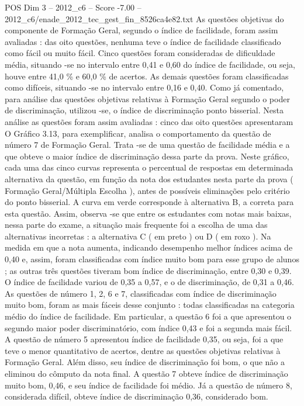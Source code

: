 \begin{textsample}{POS Dim 3 – 2012\_c6 – Score -7.00 – 2012\_c6/enade\_2012\_tec\_gest\_fin\_8526ca4e82.txt}
As questões objetivas do componente de Formação Geral, segundo o índice de facilidade, foram assim avaliadas : das oito questões, nenhuma teve o índice de facilidade classificado como fácil ou muito fácil.
Cinco questões foram consideradas de dificuldade média, situando -se no intervalo entre 0,41 e 0,60 do índice de facilidade, ou seja, houve entre 41,0 \% e 60,0 \% de acertos.
As demais questões foram classificadas como difíceis, situando -se no intervalo entre 0,16 e 0,40.
Como já comentado, para análise das questões objetivas relativas à Formação Geral segundo o poder de discriminação, utilizou -se, o índice de discriminação ponto bisserial.
Nesta análise as questões foram assim avaliadas : cinco das oito questões apresentaram O Gráfico 3.13, para exemplificar, analisa o comportamento da questão de número 7 de Formação Geral.
Trata -se de uma questão de facilidade média e a que obteve o maior índice de discriminação dessa parte da prova.
Neste gráfico, cada uma das cinco curvas representa o percentual de respostas em determinada alternativa da questão, em função da nota dos estudantes nesta parte da prova ( Formação Geral/Múltipla Escolha ), antes de possíveis eliminações pelo critério do ponto bisserial.
A curva em verde corresponde à alternativa B, a correta para esta questão.
Assim, observa -se que entre os estudantes com notas mais baixas, nessa parte do exame, a situação mais frequente foi a escolha de uma das alternativas incorretas : a alternativa C ( em preto ) ou D ( em roxo ).
Na medida em que a nota aumenta, indicando desempenho melhor índices acima de 0,40 e, assim, foram classificadas com índice muito bom para esse grupo de alunos ; as outras três questões tiveram bom índice de discriminação, entre 0,30 e 0,39.
O índice de facilidade variou de 0,35 a 0,57, e o de discriminação, de 0,31 a 0,46.
As questões de número 1, 2, 6 e 7, classificadas com índice de discriminação muito bom, foram as mais fáceis desse conjunto : todas classificadas na categoria médio do índice de facilidade.
Em particular, a questão 6 foi a que apresentou o segundo maior poder discriminatório, com índice 0,43 e foi a segunda mais fácil.
A questão de número 5 apresentou índice de facilidade 0,35, ou seja, foi a que teve o menor quantitativo de acertos, dentre as questões objetivas relativas à Formação Geral.
Além disso, seu índice de discriminação foi bom, o que não a eliminou do cômputo da nota final.
A questão 7 obteve índice de discriminação muito bom, 0,46, e seu índice de facilidade foi médio.
Já a questão de número 8, considerada difícil, obteve índice de discriminação 0,36, considerado bom.

\end{textsample}
